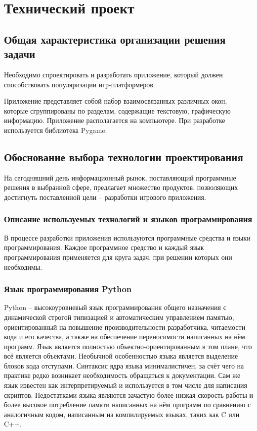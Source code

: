 \section{Технический проект}
\subsection{Общая характеристика организации решения задачи}

Необходимо спроектировать и разработать приложение, который должен способствовать популяризации игр-платформеров.

Приложение представляет собой набор взаимосвязанных различных окон, которые сгруппированы по разделам, содержащие текстовую, графическую информацию. Приложение располагается на компьютере. При разработке используется библиотека Pygame.

\subsection{Обоснование выбора технологии проектирования}

На сегодняшний день информационный рынок, поставляющий программные решения в выбранной сфере, предлагает множество продуктов, позволяющих достигнуть поставленной цели – разработки игрового приложения.

\subsubsection{Описание используемых технологий и языков программирования}

В процессе разработки приложения используются программные средства и языки программирования. Каждое программное средство и каждый язык программирования применяется для круга задач, при решении которых они необходимы.

\subsubsection{Язык программирования Python}

Python –  высокоуровневый язык программирования общего назначения с динамической строгой типизацией и автоматическим управлением памятью, ориентированный на повышение производительности разработчика, читаемости кода и его качества, а также на обеспечение переносимости написанных на нём программ. Язык является полностью объектно-ориентированным в том плане, что всё является объектами. Необычной особенностью языка является выделение блоков кода отступами. Синтаксис ядра языка минималистичен, за счёт чего на практике редко возникает необходимость обращаться к документации. Сам же язык известен как интерпретируемый и используется в том числе для написания скриптов. Недостатками языка являются зачастую более низкая скорость работы и более высокое потребление памяти написанных на нём программ по сравнению с аналогичным кодом, написанным на компилируемых языках, таких как C или C++.

